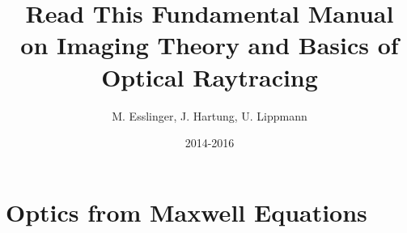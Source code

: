 \documentclass[12pt,a4paper,twoside,openright,BCOR10mm,headsepline,titlepage,abstracton,chapterprefix,final]{scrreprt}
\begin{document}

\titlehead{ }
\subject{Pyrate -- Optical raytracing based on Python}
\title{Read This Fundamental Manual \\ on Imaging Theory and Basics of Optical Raytracing}
\author{M. Esslinger, J. Hartung, U. Lippmann}
\date{2014-2016}
\publishers{}
\maketitle

\onehalfspacing

\tableofcontents

\cleardoublepage


\singlespacing


\chapter{Optics from Maxwell Equations}
\end{document}
